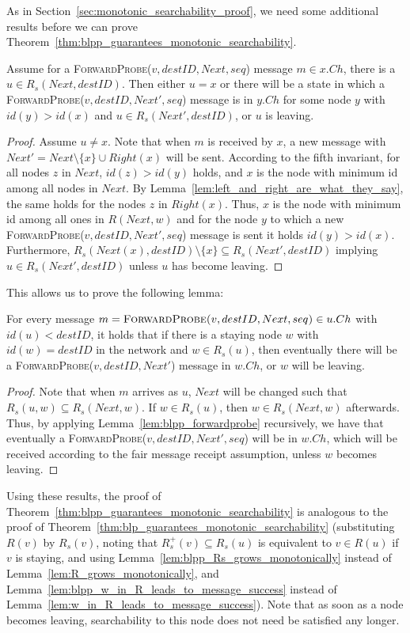 \documentclass[a4paper,USenglish]{lipics}
\newcommand{\forwardprobe}[1]{\textsc{ForwardProbe(\ensuremath{#1})}\xspace}
\newcommand{\rsp}{\ensuremath{R_s^+}\xspace}
\begin{document}
As in Section~\ref{sec:monotonic_searchability_proof}, we need some additional results before we can prove Theorem~\ref{thm:blpp_guarantees_monotonic_searchability}.
\begin{lemma}\label{lem:blpp_forwardprobe}
Assume for a \forwardprobe{v,destID, Next, seq} message $m \in x.Ch$, there is a $u \in R_s(Next,destID)$.
Then either $u = x$ or there will be a state in which a \forwardprobe{v,destID, Next', seq} message is in $y.Ch$ for some node $y$ with $id(y) > id(x)$ and $u \in R_s(Next',destID)$, or $u$ is leaving.
\end{lemma}
\begin{proof}
    Assume $u \neq x$.
    Note that when $m$ is received by $x$, a new message with $Next' = Next\setminus\{x\} \cup Right(x)$ will be sent.
    According to the fifth invariant, for all nodes $z$ in $Next$, $id(z) > id(y)$ holds, and $x$ is the node with minimum id among all nodes in $Next$.
    By Lemma~\ref{lem:left_and_right_are_what_they_say}, the same holds for the nodes $z$ in $Right(x)$.
    Thus, $x$ is the node with minimum id among all ones in $R(Next,w)$ and for the node $y$ to which a new \forwardprobe{v,destID,Next',seq} message is sent it holds $id(y) > id(x)$.
    Furthermore, $R_s(Next(x),destID)\setminus \{x\} \subseteq R_s(Next',destID)$ implying $u \in R_s(Next',destID)$ unless $u$ has become leaving.
\end{proof}
This allows us to prove the following lemma:
\begin{lemma}\label{lem:blpp_w_in_R_leads_to_message_success}
 For every message $m = \forwardprobe{v,destID, Next, seq} \in u.Ch$ with $id(u) < destID$, it holds that if there is a staying node $w$ with $id(w)=destID$ in the network and $w \in R_s(u)$, then eventually there will be a \forwardprobe{v,destID,Next'} message in $w.Ch$, or $w$ will be leaving.
\end{lemma}
\begin{proof}
	Note that when $m$ arrives as $u$, $Next$ will be changed such that $R_s(u,w) \subseteq R_s(Next,w)$.
	If $w \in R_s(u)$, then $w \in R_s(Next,w)$ afterwards.
	Thus, by applying Lemma~\ref{lem:blpp_forwardprobe} recursively, we have that eventually a \forwardprobe{v,destID, Next', seq} will be in $w.Ch$, which will be received according to the fair message receipt assumption, unless $w$ becomes leaving.
\end{proof}

Using these results, the proof of Theorem~\ref{thm:blpp_guarantees_monotonic_searchability} is analogous to the proof of Theorem~\ref{thm:blp_guarantees_monotonic_searchability} (substituting $R(v)$ by $R_s(v)$, noting that $\rsp(v) \subseteq R_s(u)$ is equivalent to $v \in R(u)$ if $v$ is staying, and using Lemma~\ref{lem:blpp_Rs_grows_monotonically} instead of Lemma~\ref{lem:R_grows_monotonically}, and Lemma~\ref{lem:blpp_w_in_R_leads_to_message_success} instead of Lemma~\ref{lem:w_in_R_leads_to_message_success}).
Note that as soon as a node becomes leaving, searchability to this node does not need be satisfied any longer.
\end{document}
